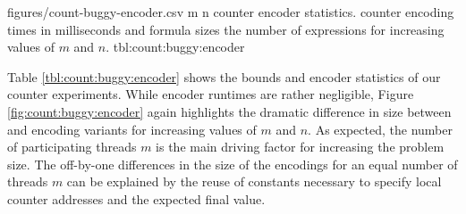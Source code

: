 

\newcommand{\CountRowHeader}[1]{\StrSubstitute{#1}{ }{\hfill}}


\bigbreak

\EncoderStatsTable
  {figures/count-buggy-encoder.csv}
  {m n}
  {\CountRowHeader}
  { counter encoder statistics.}
  { counter encoding times in milliseconds and formula sizes  the number of expressions for increasing values of $m$ and $n$.}
  {tbl:count:buggy:encoder}

Table \ref{tbl:count:buggy:encoder} shows the bounds and encoder statistics of our  counter experiments.
While encoder runtimes are rather negligible, Figure \ref{fig:count:buggy:encoder} again highlights the dramatic difference in size between {\BTOR} and {\SMTLIB} encoding variants for increasing values of $m$ and $n$. %
As expected, the number of participating threads $m$ is the main driving factor for
increasing the problem size.
The off-by-one differences in the size of the {\BTOR} encodings for an equal number of threads $m$ can be explained by the reuse of constants necessary to specify local counter addresses and the expected final value.

